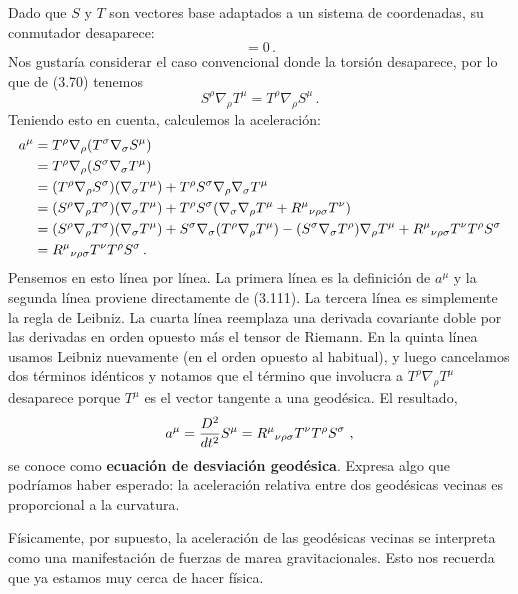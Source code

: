 \documentclass[11pt,b5paper,openany,twoside]{book}
\begin{document}
Dado que $S$ y $T$ son vectores base adaptados a un sistema de coordenadas, su conmutador desaparece:
\begin{equation*}
[S,T]=0\,.
\end{equation*}
Nos gustaría considerar el caso convencional donde la torsión desaparece, por lo que de (3.70) tenemos
\begin{equation}
S^\rho\nabla_\rho T^\mu = T^\rho\nabla_\rho S^\mu \,.\label{3.111}
\end{equation}
Teniendo esto en cuenta, calculemos la aceleración:
\begin{align}
a^\mu &=  T^\rho\nabla_\rho(T^\sigma\nabla_\sigma S^\mu) \notag \\
&=  T^\rho\nabla_\rho (S^\sigma\nabla_\sigma T^\mu) \notag \\
&= (T^\rho\nabla_\rho S^\sigma)(\nabla_\sigma T^\mu) +
T^\rho S^\sigma\nabla_\rho\nabla_\sigma T^\mu \notag \\
&= (S^\rho\nabla_\rho T^\sigma)(\nabla_\sigma T^\mu) +
T^\rho S^\sigma(\nabla_\sigma\nabla_\rho T^\mu
+R^\mu{}_{\nu\rho\sigma}T^\nu) \notag \\
&=  (S^\rho\nabla_\rho T^\sigma)(\nabla_\sigma T^\mu) +
S^\sigma\nabla_\sigma(T^\rho\nabla_\rho T^\mu)
-(S^\sigma\nabla_\sigma T^\rho)\nabla_\rho T^\mu
+R^\mu{}_{\nu\rho\sigma}T^\nu T^\rho S^\sigma \notag \\
&=  R^\mu{}_{\nu\rho\sigma}T^\nu T^\rho S^\sigma\,.
\label{3.112}
\end{align}
Pensemos en esto línea por línea.
La primera línea es la definición de $a^\mu$ y la segunda línea proviene directamente de (3.111).
La tercera línea es simplemente la regla de Leibniz.
La cuarta línea reemplaza una derivada covariante doble por las derivadas en orden opuesto más el tensor de Riemann.
En la quinta línea usamos Leibniz nuevamente (en el orden opuesto al habitual), y luego cancelamos dos términos idénticos y notamos que el término que involucra a $T^\rho\nabla_\rho T^\mu$ desaparece porque $T^\mu$ es el vector tangente a una geodésica.
El resultado,
\begin{equation}
a^\mu = {{D^2}\over{dt^2}}S^\mu = R^\mu{}_{\nu\rho\sigma}T^\nu
T^\rho S^\sigma\ ,\label{3.113}
\end{equation}
se conoce como {\bf ecuación de desviación geodésica}.
Expresa algo que podríamos haber esperado: la aceleración relativa entre dos geodésicas vecinas es proporcional a la curvatura.

Físicamente, por supuesto, la aceleración de las geodésicas vecinas se interpreta como una manifestación de fuerzas de marea gravitacionales.
Esto nos recuerda que ya estamos muy cerca de hacer física.
\end{document}
